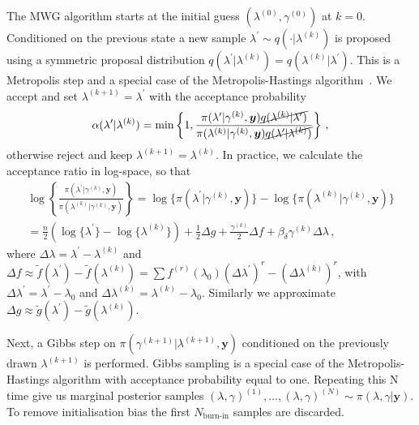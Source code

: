 The MWG algorithm starts at the initial guess $( \lambda^{(0)} , \gamma^{(0)}  )$ at $k=0$.
Conditioned on the previous state a new sample $\lambda^{\prime} \sim q(\cdot |  \lambda^{(k)})$ is proposed using a symmetric proposal distribution $q(\lambda^{\prime} |  \lambda^{(k)}) = q(\lambda^{(k)} |  \lambda^{\prime})$.
This is a Metropolis step and a special case of the Metropolis-Hastings algorithm~\cite{roberts2006harris}.
We accept and set $\lambda^{(k+1)} = \lambda^{\prime}$ with the acceptance probability
\begin{align}
\alpha( \lambda^{\prime} | \lambda^{(k)}) = \min \left\{ 1, \frac{\pi(\lambda^{\prime}  | \gamma^{(k)}, \bm{y}) \cancel{q(\lambda^{(k)} | \lambda^{\prime} ) } }{\pi(\lambda^{(k)} | \gamma^{(k)}, \bm{y}) \cancel{q(\lambda^{\prime} | \lambda^{(k)})} } \right\} \, ,
\end{align}
otherwise reject and keep $\lambda^{(k+1)} = \lambda^{(k)}$.
In practice, we calculate the acceptance ratio in log-space, so that
\begin{align} 
	\log \left\{ \frac{\pi(\lambda^{\prime} | \gamma^{(k)}, \bm{y})  }{\pi(\lambda^{(k)}| \gamma^{(k)}, \bm{y})}  \right\} 
	= \log  \{\pi(\lambda^{\prime} | \gamma^{(k)}, \bm{y} ) \}  -\log  \{ \pi(\lambda^{(k)}| \gamma^{(k)}, \bm{y}) \} \\
	= \frac{n}{2} (\log\{\lambda^{\prime}\} - \log\{\lambda^{(k)}\} ) + \frac{1}{2} \Delta g + \frac{\gamma^{(k)}}{2} \Delta f  + \beta_\delta \gamma^{(k)} \Delta \lambda  \, ,
\end{align}
where $\Delta \lambda = \lambda^{\prime} - \lambda^{(k)} $ and  $\Delta f \approx  \tilde{f} (\lambda^\prime) - \tilde{f}(\lambda^{(k)}) =   \sum f^{(r)}(\lambda_0) (\Delta \lambda^\prime )^r- (\Delta \lambda^{(k)} )^r $, with  $\Delta \lambda^{\prime} = \lambda^\prime - \lambda_0 $ and $\Delta \lambda^{(k)} =  \lambda^{(k)} - \lambda_0$.
Similarly we approximate $\Delta g \approx \tilde{g}(\lambda^{\prime}) -\tilde{g}(\lambda^{(k)})$.

Next, a Gibbs step on $\pi(	\gamma^{(k+1)} |  \lambda^{(k+1)}, \bm{y}) $ conditioned on the previously drawn $ \lambda^{(k+1)}$ is performed.
Gibbs sampling is a special case of the Metropolis-Hastings algorithm with acceptance probability equal to one.
Repeating this N time give us marginal posterior samples $(\lambda, \gamma)^{(1)}, \dots, (\lambda, \gamma)^{(N)} \sim  \pi(\lambda, \gamma| \bm{y})$.
To remove initialisation bias the first $N_{\text{burn-in}}$ samples are discarded.


